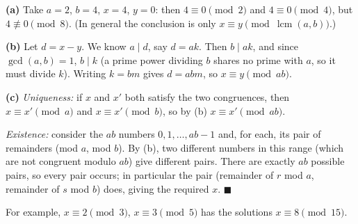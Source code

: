 \textbf{(a)} Take $a=2$, $b=4$, $x=4$, $y=0$: then $4\equiv0\pmod2$ and $4\equiv0\pmod4$, but $4\not\equiv0\pmod8$. (In general the conclusion is only $x\equiv y\pmod{\operatorname{lcm}(a,b)}$.)

\textbf{(b)} Let $d=x-y$. We know $a\mid d$, say $d=ak$. Then $b\mid ak$, and since $\gcd(a,b)=1$, $b\mid k$ (a prime power dividing $b$ shares no prime with $a$, so it must divide $k$). Writing $k=bm$ gives $d=abm$, so $x\equiv y\pmod{ab}$.

\textbf{(c)} \emph{Uniqueness:} if $x$ and $x'$ both satisfy the two congruences, then $x\equiv x'\pmod a$ and $x\equiv x'\pmod b$, so by (b) $x\equiv x'\pmod{ab}$.

\emph{Existence:} consider the $ab$ numbers $0,1,\dots,ab-1$ and, for each, its pair of remainders (mod $a$, mod $b$). By (b), two different numbers in this range (which are not congruent modulo $ab$) give different pairs. There are exactly $ab$ possible pairs, so every pair occurs; in particular the pair (remainder of $r$ mod $a$, remainder of $s$ mod $b$) does, giving the required $x$. $\blacksquare$

For example, $x\equiv2\pmod3$, $x\equiv3\pmod5$ has the solutions $x\equiv8\pmod{15}$.
